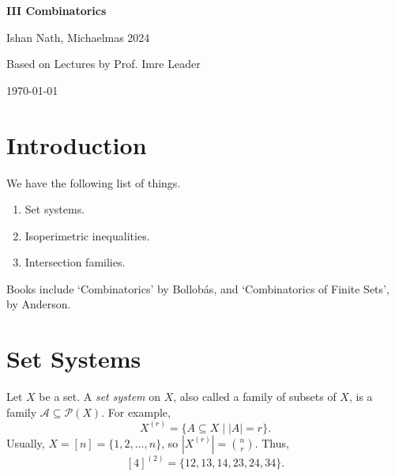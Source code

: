\documentclass[12pt]{article}
\begin{document}
\hypersetup{pageanchor=false}
\begin{titlepage}
	\begin{center}
		\vspace*{1em}
		\Huge
		\textbf{III Combinatorics}

		\vspace{1em}
		\large
		Ishan Nath, Michaelmas 2024

		\vspace{1.5em}

		\Large

		Based on Lectures by Prof. Imre Leader

		\vspace{1em}

		\large
		\today
	\end{center}
	
\end{titlepage}
\hypersetup{pageanchor=true}

\tableofcontents

\newpage


\setcounter{section}{-1}

\section{Introduction}%
\label{sec:intro}

We have the following list of things.
\begin{enumerate}[1:]
	\item Set systems.
	\item Isoperimetric inequalities.
	\item Intersection families.
\end{enumerate}

Books include `Combinatorics' by Bollob\'as, and `Combinatorics of Finite Sets', by Anderson.

\newpage

\section{Set Systems}%
\label{sec:ss}

Let $X$ be a set. A \emph{set system} on $X$, also called a family of subsets of $X$, is a family $\mathcal{A} \subseteq \mathcal{P}(X)$. For example,
\[
	X^{(r)} = \{A \subseteq X \mid |A| = r \}.
\]
Usually, $X = [n] = \{1, 2, \ldots, n\}$, so $|X^{(r)}| = \binom nr$. Thus,
\[
	[4]^{(2)} = \{12, 13, 14, 23, 24, 34\}.
\]
\end{document}
